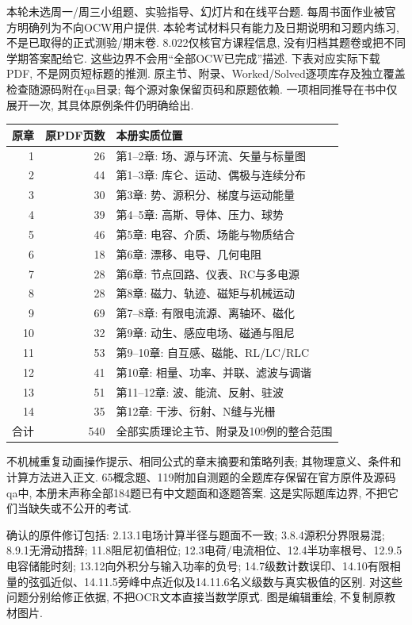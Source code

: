 本轮未选周一/周三小组题、实验指导、幻灯片和在线平台题. 每周书面作业被官方明确列为不向OCW用户提供. 本轮考试材料只有能力及日期说明和习题内练习, 不是已取得的正式测验/期末卷. 8.022仅核官方课程信息, 没有归档其题卷或把不同学期答案配给它. 这些边界不会用“全部OCW已完成”描述.
下表对应实际下载PDF, 不是网页短标题的推测. 原主节、附录、Worked/Solved逐项库存及独立覆盖检查随源码附在qa目录; 每个源对象保留页码和原题依赖. 一项相同推导在书中仅展开一次, 其具体原例条件仍明确给出.
\begin{center}\begin{tabular}{rrp{.56\linewidth}}\toprule
原章 & 原PDF页数 & 本册实质位置\\\midrule
1 & 26 & 第1--2章: 场、源与环流、矢量与标量图\\
2 & 44 & 第1--3章: 库仑、运动、偶极与连续分布\\
3 & 30 & 第3章: 势、源积分、梯度与运动能量\\
4 & 39 & 第4--5章: 高斯、导体、压力、球势\\
5 & 46 & 第5章: 电容、介质、场能与物质结合\\
6 & 18 & 第6章: 漂移、电导、几何电阻\\
7 & 28 & 第6章: 节点回路、仪表、RC与多电源\\
8 & 28 & 第8章: 磁力、轨迹、磁矩与机械运动\\
9 & 69 & 第7--8章: 有限电流源、离轴环、磁化\\
10 & 32 & 第9章: 动生、感应电场、磁通与阻尼\\
11 & 53 & 第9--10章: 自互感、磁能、RL/LC/RLC\\
12 & 41 & 第10章: 相量、功率、并联、滤波与调谐\\
13 & 51 & 第11--12章: 波、能流、反射、驻波\\
14 & 35 & 第12章: 干涉、衍射、N缝与光栅\\\midrule
合计 & 540 & 全部实质理论主节、附录及109例的整合范围\\\bottomrule
\end{tabular}\end{center}
不机械重复动画操作提示、相同公式的章末摘要和策略列表; 其物理意义、条件和计算方法进入正文. 65概念题、119附加自测题的全题库存保留在官方原件及源码qa中, 本册未声称全部184题已有中文题面和逐题答案. 这是实际题库边界, 不把它们当缺失或不公开的考试.

确认的原件修订包括: 2.13.1电场计算半径与题面不一致; 3.8.4源积分界限易混; 8.9.1无滑动措辞; 11.8阻尼初值相位; 12.3电荷/电流相位、12.4半功率根号、12.9.5电容储能时刻; 13.12向外积分与输入功率的负号; 14.7级数计数误印、14.10有限相量的弦弧近似、14.11.5旁峰中点近似及14.11.6名义级数与真实极值的区别. 对这些问题分别给修正依据, 不把OCR文本直接当数学原式. 图是编辑重绘, 不复制原教材图片.

